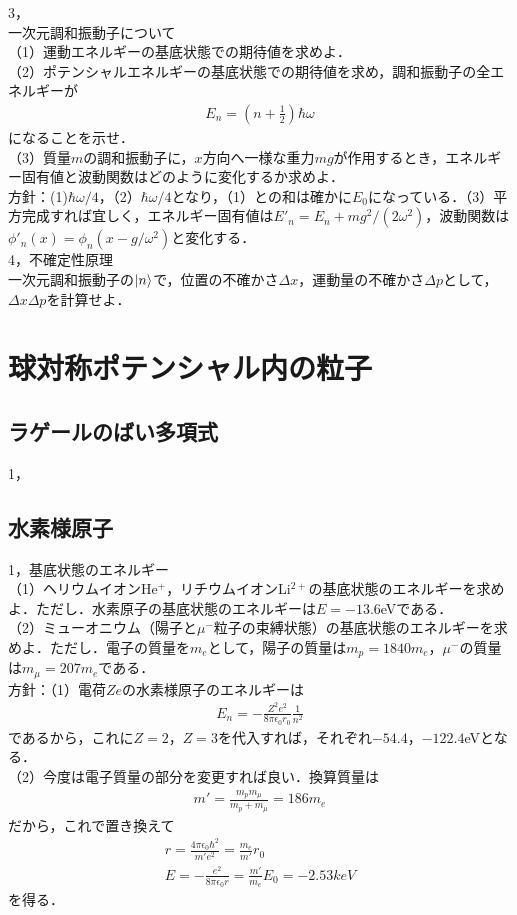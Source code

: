 \documentclass[a4j]{jarticle}
\begin{document}
3，\\
一次元調和振動子について\\
（1）運動エネルギーの基底状態での期待値を求めよ．\\
（2）ポテンシャルエネルギーの基底状態での期待値を求め，調和振動子の全エネルギーが
\begin{align*}
 E_n=\left(n+\frac{1}{2}\right)\hbar\omega
\end{align*}
になることを示せ．\\
（3）質量$m$の調和振動子に，$x$方向へ一様な重力$mg$が作用するとき，エネルギー固有値と波動関数はどのように変化するか求めよ．\\

方針：(1)$\hbar\omega /4$，（2）$\hbar\omega /4$となり，（1）との和は確かに$E_0$になっている．（3）平方完成すれば宜しく，エネルギー固有値は$E'_n=E_n+mg^2/(2\omega^2)$，波動関数は$\phi'_n(x)=\phi_n(x-g/\omega^2)$と変化する．\\

4，不確定性原理\\
一次元調和振動子の$\ket{n}$で，位置の不確かさ$\Delta x$，運動量の不確かさ$\Delta p$として，$\Delta x\Delta p$を計算せよ．



\section{球対称ポテンシャル内の粒子}
\subsection{ラゲールのばい多項式}

1，


\subsection{水素様原子}
1，基底状態のエネルギー\\
（1）ヘリウムイオンHe$^+$，リチウムイオンLi$^{2+}$の基底状態のエネルギーを求めよ．ただし．水素原子の基底状態のエネルギーは$E=-13.6$eVである．\\
（2）ミューオニウム（陽子と$\mu^-$粒子の束縛状態）の基底状態のエネルギーを求めよ．ただし．電子の質量を$m_e$として，陽子の質量は$m_p=1840m_e$，$\mu^-$の質量は$m_\mu=207m_e$である．\\
方針：（1）電荷$Ze$の水素様原子のエネルギーは
\begin{align*}
 E_n=-\frac{Z^2e^2}{8\pi \epsilon_0r_0}\frac{1}{n^2}
\end{align*}
であるから，これに$Z=2$，$Z=3$を代入すれば，それぞれ$-54.4$，$-122.4$eVとなる．\\
（2）今度は電子質量の部分を変更すれば良い．換算質量は
\begin{align*}
 m'=\frac{m_pm_\mu}{m_p+m_\mu}=186m_e
\end{align*}
だから，これで置き換えて
\begin{align*}
 r=\frac{4\pi\epsilon_0\hbar^2}{m'e^2}=\frac{m_e}{m'}r_0\\
 E=-\frac{e^2}{8\pi\epsilon_0r}=\frac{m'}{m_e}E_0=-2.53keV
\end{align*}
を得る．\\
\end{document}
